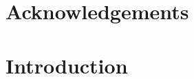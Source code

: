\documentclass[]{nucthesis}
\title{\mytitle}
\author{\myname}
\begin{document}
\maketitle
\titlepage
\thispagestyle{empty} 

\plagdeclaration %

\frontmatter
\begin{abstract}
\guideabs %
Lorem ipsum dolor sit amet, consectetuer adipiscing elit.  Ut purus elit, vestibulum ut,placerat ac, adipiscing vitae, felis.  Curabitur dictum gravida mauris.  Nam arcu libero,nonummy  eget,  consectetuer  id,  vulputate  a,  magna.   Donec  vehicula  augue  eu  neque.Pellentesque  habitant  morbi  tristique  senectus  et  netus  et  malesuada  fames  ac  turpisegestas.  Mauris ut leo
\end{abstract}



\chapter*{Acknowledgements}
\guideack %

\tableofcontents{}
\newpage
\listoffigures{}
\newpage
\listoftables{}
\newpage
\newpage



\mainmatter
\chapter{Introduction}
\guideintro  %
\end{document}
